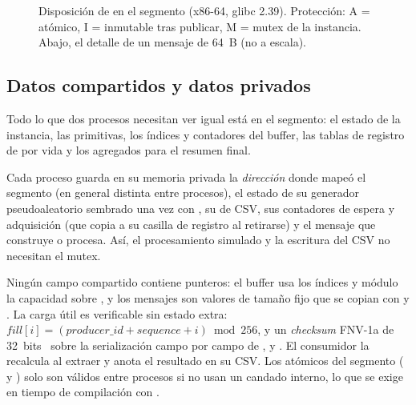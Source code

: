 \begin{figure}[!t]
\caption{Disposición de  en el segmento (x86-64, glibc
2.39). Protección: A = atómico, I = inmutable tras publicar, M = mutex de
la instancia. Abajo, el detalle de un mensaje de 64~B (no a escala).}
\label{fig:segmento}
\end{figure}

\subsection{Datos compartidos y datos privados}

Todo lo que dos procesos necesitan ver igual está en el segmento: el estado
de la instancia, las primitivas, los índices y contadores del buffer, las
tablas de registro de por vida y los agregados para el resumen final.

Cada proceso guarda en su memoria privada la \emph{dirección} donde mapeó
el segmento (en general distinta entre procesos), el estado de su
generador pseudoaleatorio sembrado una vez con , su
 de CSV, sus contadores de espera y adquisición (que copia a su
casilla de registro al retirarse) y el mensaje que construye o procesa.
Así, el procesamiento simulado y la escritura del CSV no necesitan el
mutex.

Ningún campo compartido contiene punteros: el buffer usa los índices
 y  módulo la capacidad sobre , y
los mensajes son valores de tamaño fijo que se copian con
 y . La carga útil es verificable sin
estado extra: $\mathit{fill}[i] = (\mathit{producer\_id} +
\mathit{sequence} + i) \bmod 256$, y un \emph{checksum} FNV-1a de
32~bits~\cite{FNV} sobre la serialización campo por campo de
,  y . El consumidor la
recalcula al extraer y anota el resultado en su CSV.
Los atómicos del segmento ( y ) solo son válidos
entre procesos si no usan un candado interno, lo que se exige en tiempo de
compilación con .

